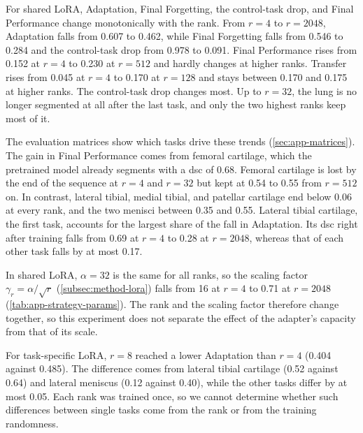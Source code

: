 For shared LoRA, Adaptation, Final Forgetting, the control-task drop, and Final Performance change monotonically with the rank.
From $r = 4$ to $r = 2048$, Adaptation falls from 0.607 to 0.462, while Final Forgetting falls from 0.546 to 0.284 and the control-task drop from 0.978 to 0.091.
Final Performance rises from 0.152 at $r = 4$ to 0.230 at $r = 512$ and hardly changes at higher ranks.
Transfer rises from 0.045 at $r = 4$ to 0.170 at $r = 128$ and stays between 0.170 and 0.175 at higher ranks.
The control-task drop changes most.
Up to $r = 32$, the lung is no longer segmented at all after the last task, and only the two highest ranks keep most of it.

The evaluation matrices show which tasks drive these trends (\cref{sec:app-matrices}).
The gain in Final Performance comes from femoral cartilage, which the pretrained model already segments with a \gls{dsc} of 0.68.
Femoral cartilage is lost by the end of the sequence at $r = 4$ and $r = 32$ but kept at 0.54 to 0.55 from $r = 512$ on.
In contrast, lateral tibial, medial tibial, and patellar cartilage end below 0.06 at every rank, and the two menisci between 0.35 and 0.55.
Lateral tibial cartilage, the first task, accounts for the largest share of the fall in Adaptation.
Its \gls{dsc} right after training falls from 0.69 at $r = 4$ to 0.28 at $r = 2048$, whereas that of each other task falls by at most 0.17.

In shared LoRA, $\alpha = 32$ is the same for all ranks, so the scaling factor $\gamma_r = \alpha / \sqrt{r}$ (\cref{subsec:method-lora}) falls from 16 at $r = 4$ to 0.71 at $r = 2048$ (\cref{tab:app-strategy-params}).
The rank and the scaling factor therefore change together, so this experiment does not separate the effect of the adapter's capacity from that of its scale.

For task-specific LoRA, $r = 8$ reached a lower Adaptation than $r = 4$ (0.404 against 0.485).
The difference comes from lateral tibial cartilage (0.52 against 0.64) and lateral meniscus (0.12 against 0.40), while the other tasks differ by at most 0.05.
Each rank was trained once, so we cannot determine whether such differences between single tasks come from the rank or from the training randomness.


